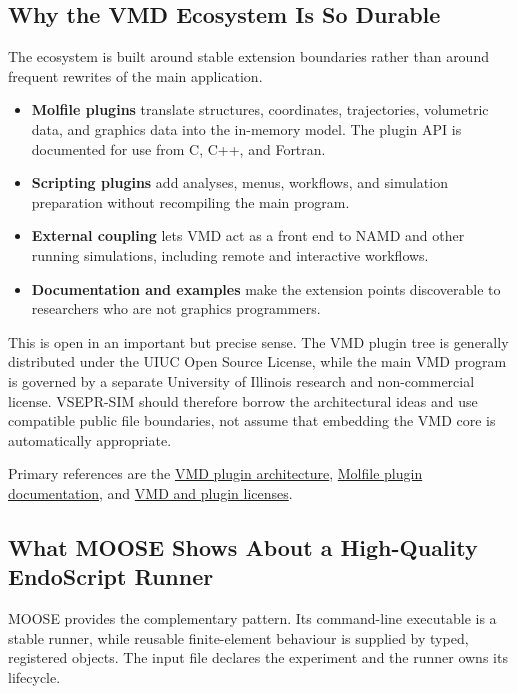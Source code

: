 \documentclass[11pt,a4paper]{article}
\begin{document}
\subsection{Why the VMD Ecosystem Is So Durable}

The ecosystem is built around stable extension boundaries rather than around
frequent rewrites of the main application.

\begin{itemize}
  \item \textbf{Molfile plugins} translate structures, coordinates,
        trajectories, volumetric data, and graphics data into the in-memory
        model.  The plugin API is documented for use from C, C++, and Fortran.
  \item \textbf{Scripting plugins} add analyses, menus, workflows, and
        simulation preparation without recompiling the main program.
  \item \textbf{External coupling} lets VMD act as a front end to NAMD and
        other running simulations, including remote and interactive workflows.
  \item \textbf{Documentation and examples} make the extension points
        discoverable to researchers who are not graphics programmers.
\end{itemize}

This is open in an important but precise sense.  The VMD plugin tree is
generally distributed under the UIUC Open Source License, while the main VMD
program is governed by a separate University of Illinois research and
non-commercial license.  VSEPR-SIM should therefore borrow the architectural
ideas and use compatible public file boundaries, not assume that embedding
the VMD core is automatically appropriate.

Primary references are the
\href{https://www.ks.uiuc.edu/Research/vmd/plugins/doxygen/intro.html}{VMD
plugin architecture},
\href{https://www.ks.uiuc.edu/Research/vmd/plugins/molfile/}{Molfile plugin
documentation}, and
\href{https://www.ks.uiuc.edu/Research/vmd/current/LICENSE.html}{VMD and
plugin licenses}.

\subsection{What MOOSE Shows About a High-Quality EndoScript Runner}

MOOSE provides the complementary pattern.  Its command-line executable is a
stable runner, while reusable finite-element behaviour is supplied by typed,
registered objects.  The input file declares the experiment and the runner
owns its lifecycle.
\end{document}
